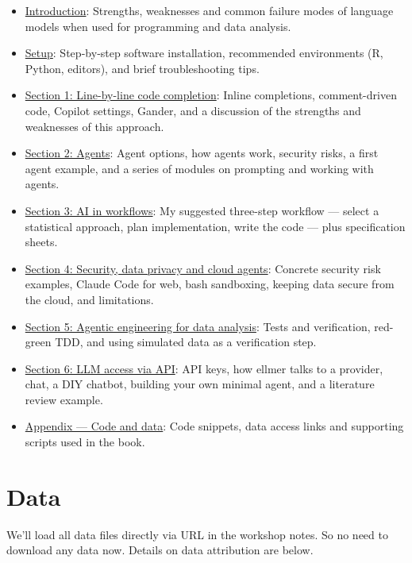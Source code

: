 \documentclass[
  letterpaper,
  DIV=11,
  numbers=noendperiod]{scrreprt}
\providecommand{\tightlist}{%
  \setlength{\itemsep}{0pt}\setlength{\parskip}{0pt}}
\begin{document}
\begin{itemize}
\tightlist
\item
  \href{01-introduction.qmd}{Introduction}: Strengths, weaknesses and
  common failure modes of language models when used for programming and
  data analysis.
\item
  \href{02-setup.qmd}{Setup}: Step‑by‑step software installation,
  recommended environments (R, Python, editors), and brief
  troubleshooting tips.
\item
  \href{section-1-line-by-line/index.qmd}{Section 1: Line-by-line code
  completion}: Inline completions, comment-driven code, Copilot
  settings, Gander, and a discussion of the strengths and weaknesses of
  this approach.
\item
  \href{section-2-agents/index.qmd}{Section 2: Agents}: Agent options,
  how agents work, security risks, a first agent example, and a series
  of modules on prompting and working with agents.
\item
  \href{section-3-workflows/index.qmd}{Section 3: AI in workflows}: My
  suggested three-step workflow --- select a statistical approach, plan
  implementation, write the code --- plus specification sheets.
\item
  \href{section-4-security-privacy/index.qmd}{Section 4: Security, data
  privacy and cloud agents}: Concrete security risk examples, Claude
  Code for web, bash sandboxing, keeping data secure from the cloud, and
  limitations.
\item
  \href{section-5-agentic-engineering/index.qmd}{Section 5: Agentic
  engineering for data analysis}: Tests and verification, red-green TDD,
  and using simulated data as a verification step.
\item
  \href{section-6-api-access/index.qmd}{Section 6: LLM access via API}:
  API keys, how ellmer talks to a provider, chat, a DIY chatbot,
  building your own minimal agent, and a literature review example.
\item
  \href{99-appendix.qmd}{Appendix --- Code and data}: Code snippets,
  data access links and supporting scripts used in the book.
\end{itemize}

\section{Data}\label{data}

We'll load all data files directly via URL in the workshop notes. So no
need to download any data now. Details on data attribution are below.
\end{document}
